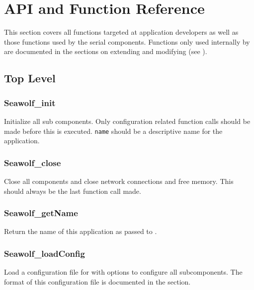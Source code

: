 \newpage
\section{API and Function Reference} \label{api}
This section covers all functions targeted at application developers as well as
those functions used by the serial components. Functions only used internally by
\libseawolf{} are documented in the sections on extending and modifying
\libseawolf{} (see ).

\subsection{Top Level} \label{apitop}
\subsubsection{Seawolf\_init} \label{apiseawolfinit}
 Initialize all \libseawolf{} sub
components. Only configuration related function calls should be made before this
is executed. \texttt{name} should be a descriptive name for the application.

\subsubsection{Seawolf\_close} \label{apiseawolfclose}
 Close all \libseawolf{} components and close
network connections and free memory. This should always be the last
\libseawolf{} function call made.

\subsubsection{Seawolf\_getName} \label{apiseawolfgetname}
 Return the name of this application as passed
to .

\subsubsection{Seawolf\_loadConfig} \label{apiseawolfconfig}
 Load a configuration file
for \libseawolf{} with options to configure all subcomponents. The format of
this configuration file is documented in the
 section.


